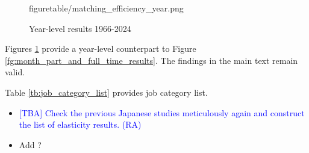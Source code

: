 \documentclass[12pt]{article}
\begin{document}
\begin{figure}[!ht]
\begin{center}
{  {figuretable/matching_efficiency_year.png}}
  \\
  \caption{Year-level results 1966-2024}
  \label{fg:year_results} 
  \end{center}
  \footnotesize
\end{figure} 

Figures \ref{fg:year_results} provide a year-level counterpart to Figure \ref{fg:month_part_and_full_time_results}. 
The findings in the main text remain valid.

Table \ref{tb:job_category_list} provides job category list.

\begin{itemize}
    \item \textcolor{blue}{[TBA] Check the previous Japanese studies meticulously again and construct the list of elasticity results. (RA)}
    \item Add \cite{kawata2021first}?
\end{itemize}
\end{document}
